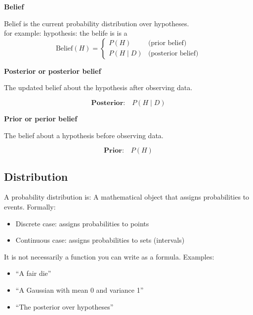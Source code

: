 \documentclass{book}
\begin{document}

{\bfseries Belief}\par
        Belief is the current probability distribution over hypotheses.\\
        for example: hypothesis:  the belife is is a
        \begin{equation*}
            \mathrm{Belief}(H) =
            \begin{cases}
                P(H) & \text{(prior belief)} \\
                P(H \mid D) & \text{(posterior belief)}
            \end{cases}
        \end{equation*}


\bigskip
    {\bfseries Posterior or posterior belief}\par
    The updated belief about the hypothesis after observing data.\par
    \begin{equation*}
        \textbf{Posterior:}\quad P(H \mid D)
    \end{equation*}


{\bfseries Prior or perior belief}\par
    The belief about a hypothesis before observing data.\par
    \begin{equation*}
        \textbf{Prior:}\quad P(H)
    \end{equation*}

\subsection{Distribution}


A probability distribution is:
A mathematical object that assigns probabilities to events.
Formally:
\begin{itemize}
    \item Discrete case: assigns probabilities to points
    \item Continuous case: assigns probabilities to sets (intervals)
\end{itemize}
It is not necessarily a function you can write as a formula.
Examples:
\begin{itemize}
    \item “A fair die”
    \item “A Gaussian with mean 0 and variance 1”
    \item “The posterior over hypotheses”
\end{itemize}
\end{document}
